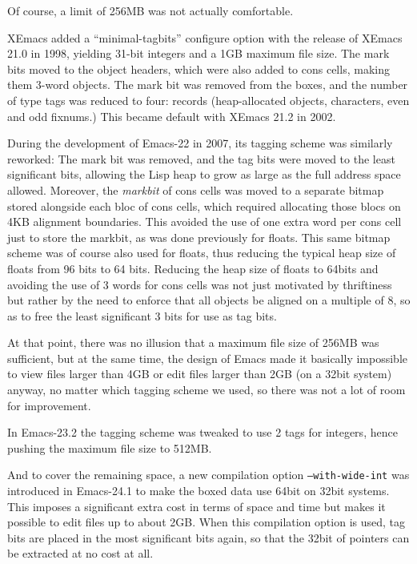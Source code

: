 \documentclass[format=acmsmall, review=false, screen=true]{acmart}
\begin{document}
Of course, a limit of 256MB was not actually comfortable.

XEmacs added a ``minimal-tagbits'' configure option with the release
of XEmacs 21.0 in 1998, yielding 31-bit integers and a 1GB maximum
file size.  The mark bits moved to the object headers, which were also
added to cons cells, making them 3-word objects.
The mark bit was removed from the boxes, and the number of
type tags was reduced to four: records (heap-allocated objects,
characters, even and odd fixnums.)  This became default with XEmacs
21.2 in 2002.

During the development of Emacs-22 in 2007, its tagging scheme was
similarly reworked: The mark bit was removed, and the tag bits were
moved to the least significant bits, allowing the Lisp heap to grow as
large as the full address space allowed.
Moreover, the \emph{markbit} of cons cells was moved to a separate bitmap
stored alongside each bloc of cons cells, which required allocating those
blocs on 4KB alignment boundaries.  This avoided the use of one extra word
per cons cell just to store the markbit, as was done previously for floats.
This same bitmap scheme
was of course also used for floats, thus reducing the typical heap size of
floats from 96 bits to 64 bits.  Reducing the heap size of floats to 64bits
and avoiding the use of 3 words for cons cells was not just motivated by
thriftiness but rather by the need to enforce that all objects be aligned on
a multiple of 8, so as to free the least significant 3 bits for use as
tag bits.

At that point, there was no illusion that a maximum file size of 256MB was
sufficient, but at the same time, the design of Emacs made it basically
impossible to view files larger than 4GB or edit files larger than 2GB (on
a 32bit system) anyway, no matter which tagging scheme we used, so there was
not a lot of room for improvement.

In Emacs-23.2 the tagging scheme was tweaked to use 2 tags for integers,
hence pushing the maximum file size to 512MB.

And to cover the remaining space, a new compilation option
\texttt{--with-wide-int} was introduced in Emacs-24.1 to make the boxed data
use 64bit on 32bit systems.  This imposes a significant extra cost in terms
of space and time but makes it possible to edit files up to about 2GB.
When this compilation option is used, tag bits are placed in the most
significant bits again, so that the 32bit of pointers can be extracted at no
cost at all.
\end{document}
